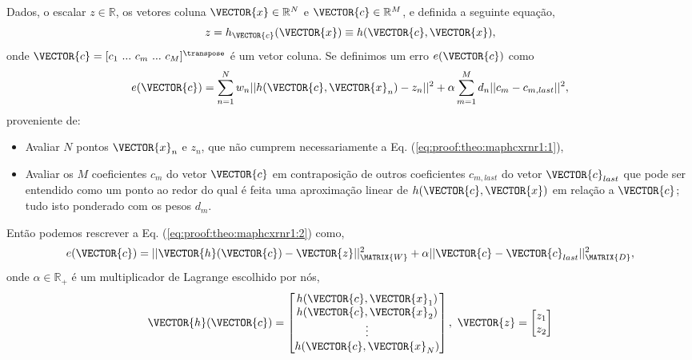 \begin{myproofT}\label{proof:theo:maphcxrnr1}
Dados,
o escalar $z \in \mathbb{R}$, os vetores coluna $\VECTOR{x} \in \mathbb{R}^N$ e $\VECTOR{c} \in \mathbb{R}^M$, e 
definida a seguinte equação,
\begin{equation}\label{eq:proof:theo:maphcxrnr1:1}
z=h_{\VECTOR{c}}(\VECTOR{x})\equiv h(\VECTOR{c},\VECTOR{x}),
\end{equation}
onde $\VECTOR{c}=[c_1~ ...~ c_m~ ...~ c_M]^{\transpose}$ é um vetor coluna.
Se definimos um erro $e(\VECTOR{c})$ como
\begin{equation}\label{eq:proof:theo:maphcxrnr1:2}
e(\VECTOR{c}) =  \sum_{n=1}^{N} w_n||h(\VECTOR{c},\VECTOR{x}_n)-z_n||^2 + \alpha \sum_{m=1}^{M} d_n||c_m-c_{m,last}||^2,
\end{equation}
proveniente de:
\begin{itemize}
\item Avaliar $N$ pontos $\VECTOR{x}_n$ e $z_n$, que não cumprem necessariamente a Eq. (\ref{eq:proof:theo:maphcxrnr1:1}), 
\item Avaliar os $M$ coeficientes $c_m$ do vetor $\VECTOR{c}$ 
em contraposição de outros coeficientes $c_{m,last}$ do vetor $\VECTOR{c}_{last}$
que pode ser entendido como um ponto ao redor do qual é feita uma aproximação
linear de $h(\VECTOR{c},\VECTOR{x})$ em relação a $\VECTOR{c}$; 
tudo isto ponderado com os pesos $d_m$.
\end{itemize}
Então podemos rescrever a Eq. (\ref{eq:proof:theo:maphcxrnr1:2}) como,
\begin{equation}\label{eq:proof:theo:maphcxrnr1:3}
e(\VECTOR{c}) =  ||\VECTOR{h}(\VECTOR{c})-\VECTOR{z}||_{\MATRIX{W}}^2 + \alpha||\VECTOR{c}-\VECTOR{c}_{last}||_{\MATRIX{D}}^2,
\end{equation}
onde $\alpha \in \mathbb{R}_+$ é um multiplicador de Lagrange escolhido por nós,
\begin{equation}
\VECTOR{h}(\VECTOR{c})=\begin{bmatrix}
h(\VECTOR{c},\VECTOR{x}_1)\\ 
h(\VECTOR{c},\VECTOR{x}_2)\\ 
\vdots\\ 
h(\VECTOR{c},\VECTOR{x}_N)
\end{bmatrix},
~
\VECTOR{z}=\begin{bmatrix}
z_1\\ 
z_2\\ 

\end{bmatrix}
\end{equation}
\end{myproofT}

